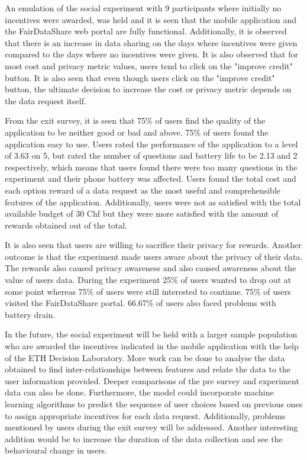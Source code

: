 An emulation of the social experiment with 9 participants where initially no incentives were awarded, was held and it is seen that the mobile application and the FairDataShare web portal are fully functional. Additionally, it is observed that there is an increase in data sharing on the days where incentives were given compared to the days where no incentives were given. It is also observed that for most cost and privacy metric values, users tend to click on the "improve credit" button. It is also seen that even though users click on the "improve credit" button, the ultimate decision to increase the cost or privacy metric depends on the data request itself.

From the exit survey, it is seen that 75\% of users find the quality of the application to be neither good or bad and above. 75\% of users found the application easy to use. Users rated the performance of the application to a level of 3.63 on 5, but rated the number of questions and battery life to be 2.13 and 2 respectively, which means that users found there were too many questions in the experiment and their phone battery was affected. Users found the total cost and each option reward of a data request as the most useful and comprehensible features of the application. Additionally, users were not as satisfied with the total available budget of 30 Chf but they were more satisfied with the amount of rewards obtained out of the total.

It is also seen that users are willing to sacrifice their privacy for rewards. Another outcome is that the experiment made users aware about the privacy of their data. The rewards also caused privacy awareness and also caused awareness about the value of users data. During the experiment 25\% of users wanted to drop out at some point whereas 75\% of users were still interested to continue. 75\% of users visited the FairDataShare portal. 66.67\% of users also faced problems with battery drain.

In the future, the social experiment will be held with a larger sample population who are awarded the incentives indicated in the mobile application with the help of the ETH Decision Laboratory. More work can be done to analyse the data obtained to find inter-relationships between features and relate the data to the user information provided. Deeper comparisons of the pre survey and experiment data can also be done. Furthermore, the model could incorporate machine learning algorithms to predict the sequence of user choices based on previous ones to assign appropriate incentives for each data request. Additionally, problems mentioned by users during the exit survey will be addressed. Another interesting addition would be to increase the duration of the data collection and see the behavioural change in users.
